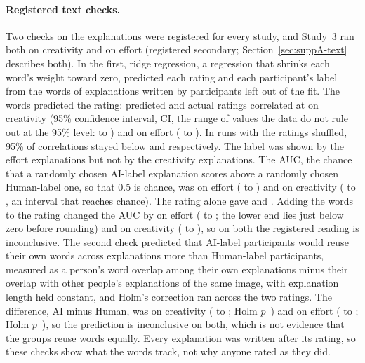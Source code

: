 \paragraph*{Registered text checks.}
Two checks on the explanations were registered for every study, and Study~3 ran both on creativity and on effort (registered secondary; Section~\ref{sec:suppA-text} describes both). In the first, ridge regression, a regression that shrinks each word's weight toward zero, predicted each rating and each participant's label from the words of explanations written by participants left out of the fit. The words predicted the rating: predicted and actual ratings correlated at \SThreeTextRecRatingCreat{} on creativity (95\% confidence interval, CI, the range of values the data do not rule out at the 95\% level: \SThreeTextRecRatingCreatLo{} to \SThreeTextRecRatingCreatHi) and \SThreeTextRecRatingEff{} on effort (\SThreeTextRecRatingEffLo{} to \SThreeTextRecRatingEffHi). In runs with the ratings shuffled, 95\% of correlations stayed below \SThreeTextRecRatingCreatNull{} and \SThreeTextRecRatingEffNull{} respectively. The label was shown by the effort explanations but not by the creativity explanations. The AUC, the chance that a randomly chosen AI-label explanation scores above a randomly chosen Human-label one, so that 0.5 is chance, was \SThreeTextRecArmEff{} on effort (\SThreeTextRecArmEffLo{} to \SThreeTextRecArmEffHi) and \SThreeTextRecArmCreat{} on creativity (\SThreeTextRecArmCreatLo{} to \SThreeTextRecArmCreatHi, an interval that reaches chance). The rating alone gave \SThreeTextRecArmFromRatingEff{} and \SThreeTextRecArmFromRatingCreat. Adding the words to the rating changed the AUC by \SThreeTextRecIncrEff{} on effort (\SThreeTextRecIncrEffLo{} to \SThreeTextRecIncrEffHi; the lower end lies just below zero before rounding) and \SThreeTextRecIncrCreat{} on creativity (\SThreeTextRecIncrCreatLo{} to \SThreeTextRecIncrCreatHi), so on both the registered reading is inconclusive. The second check predicted that AI-label participants would reuse their own words across explanations more than Human-label participants, measured as a person's word overlap among their own explanations minus their overlap with other people's explanations of the same image, with explanation length held constant, and Holm's correction ran across the two ratings. The difference, AI minus Human, was \SThreeTextOverlapCreatDiff{} on creativity (\SThreeTextOverlapCreatLo{} to \SThreeTextOverlapCreatHi; Holm $p$~\SThreeTextOverlapCreatPHolm) and \SThreeTextOverlapEffDiff{} on effort (\SThreeTextOverlapEffLo{} to \SThreeTextOverlapEffHi; Holm $p$~\SThreeTextOverlapEffPHolm), so the prediction is inconclusive on both, which is not evidence that the groups reuse words equally. Every explanation was written after its rating, so these checks show what the words track, not why anyone rated as they did.

